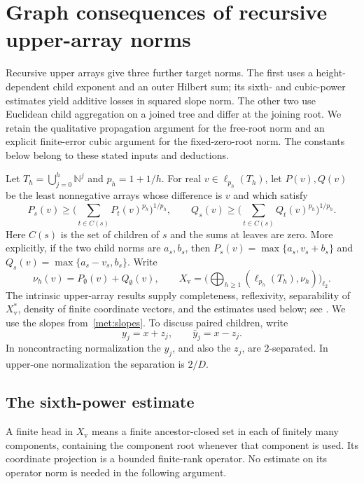 \section{Graph consequences of recursive upper-array norms}
\label{met:f:applications}

Recursive upper arrays give three further target norms. The first uses
a height-dependent child exponent and an outer Hilbert sum; its sixth-
and cubic-power estimates yield additive losses in squared slope norm.
The other two use Euclidean child aggregation on a joined tree and
differ at the joining root. We retain the qualitative propagation
argument for the free-root norm and an explicit finite-error cubic
argument for the fixed-zero-root norm. The constants below belong to
these stated inputs and deductions.

Let $T_h=\bigcup_{j=0}^h\mathbb N^j$ and $p_h=1+1/h$.
For real $v\in\ell_{p_h}(T_h)$, let $P(v),Q(v)$ be the least nonnegative
arrays whose difference is $v$ and which satisfy
\[
 P_s(v)\ge\Big(\sum_{t\in C(s)}P_t(v)^{p_h}\Big)^{1/p_h},
 \qquad
 Q_s(v)\ge\Big(\sum_{t\in C(s)}Q_t(v)^{p_h}\Big)^{1/p_h}.
\]
Here $C(s)$ is the set of children of $s$ and the sums at leaves are
zero.  More explicitly, if the two child norms are $a_s,b_s$, then
$P_s(v)=\max\{a_s,v_s+b_s\}$ and
$Q_s(v)=\max\{a_s-v_s,b_s\}$.  Write
\[
 \nu_h(v)=P_\emptyset(v)+Q_\emptyset(v),\qquad
 X_{\mathrm v}=\Big(\bigoplus_{h\ge1}(\ell_{p_h}(T_h),\nu_h)
                  \Big)_{\ell_2}.
\]
The intrinsic upper-array results supply completeness, reflexivity,
separability of $X_{\mathrm v}^*$, density of finite coordinate vectors,
and the estimates used below; see \cite[Section~7]{RecursivePotentials}.
We use the slopes from~\eqref{met:slopes}. To discuss paired children,
write
\begin{equation}\label{met:f:slopes}
 y_j=x+z_j,\qquad \bar y_j=x-z_j.
\end{equation}
In noncontracting normalization the $y_j$, and also the $z_j$, are
$2$-separated. In upper-one normalization the separation is $2/D$.

\subsection{The sixth-power estimate}

A finite head in $X_{\mathrm v}$ means a finite ancestor-closed set in
each of finitely many components, containing the component root whenever
that component is used.  Its coordinate projection is a bounded
finite-rank operator.  No estimate on its operator norm is needed in
the following argument.

